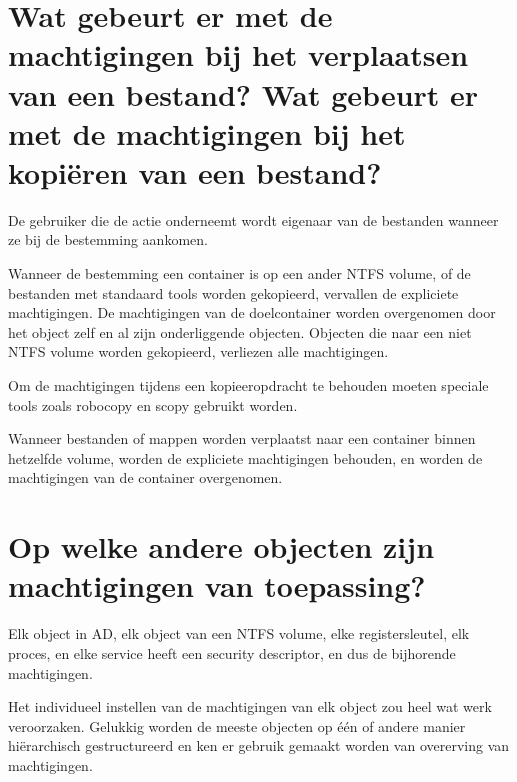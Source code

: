 \section{Wat gebeurt er met de machtigingen bij het verplaatsen van een bestand?
Wat gebeurt er met de machtigingen bij het kopiëren van een bestand?}

De gebruiker die de actie onderneemt wordt eigenaar van de bestanden wanneer ze
bij de bestemming aankomen.

Wanneer de bestemming een container is op een ander NTFS volume, of de bestanden
met standaard tools worden gekopieerd, vervallen de expliciete machtigingen. De
machtigingen van de doelcontainer worden overgenomen door het object zelf en al
zijn onderliggende objecten. Objecten die naar een niet NTFS volume worden
gekopieerd, verliezen alle machtigingen.

Om de machtigingen tijdens een kopieeropdracht te behouden moeten speciale tools
zoals robocopy en scopy gebruikt worden.

Wanneer bestanden of mappen worden verplaatst naar een container binnen
hetzelfde volume, worden de expliciete machtigingen behouden, en worden de
machtigingen van de container overgenomen.

\section{Op welke andere objecten zijn machtigingen van toepassing?}

Elk object in AD, elk object van een NTFS volume, elke registersleutel, elk
proces, en elke service heeft een security descriptor, en dus de bijhorende
machtigingen.

Het individueel instellen van de machtigingen van elk object zou heel wat werk
veroorzaken. Gelukkig worden de meeste objecten op één of andere manier
hiërarchisch gestructureerd en ken er gebruik gemaakt worden van overerving van
machtigingen.
